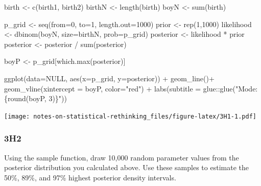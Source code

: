 \documentclass[
]{book}
\newenvironment{Shaded}{\begin{snugshade}}{\end{snugshade}}
\newcommand{\AttributeTok}[1]{\textcolor[rgb]{0.77,0.63,0.00}{#1}}
\newcommand{\ConstantTok}[1]{\textcolor[rgb]{0.00,0.00,0.00}{#1}}
\newcommand{\DecValTok}[1]{\textcolor[rgb]{0.00,0.00,0.81}{#1}}
\newcommand{\FunctionTok}[1]{\textcolor[rgb]{0.00,0.00,0.00}{#1}}
\newcommand{\NormalTok}[1]{#1}
\newcommand{\OtherTok}[1]{\textcolor[rgb]{0.56,0.35,0.01}{#1}}
\newcommand{\SpecialCharTok}[1]{\textcolor[rgb]{0.00,0.00,0.00}{#1}}
\newcommand{\StringTok}[1]{\textcolor[rgb]{0.31,0.60,0.02}{#1}}
\begin{document}
\begin{Shaded}
\begin{Highlighting}[]
\NormalTok{birth }\OtherTok{\textless{}{-}} \FunctionTok{c}\NormalTok{(birth1, birth2)}
\NormalTok{birthN }\OtherTok{\textless{}{-}} \FunctionTok{length}\NormalTok{(birth)}
\NormalTok{boyN }\OtherTok{\textless{}{-}} \FunctionTok{sum}\NormalTok{(birth)}

\NormalTok{p\_grid }\OtherTok{\textless{}{-}} \FunctionTok{seq}\NormalTok{(}\AttributeTok{from=}\DecValTok{0}\NormalTok{, }\AttributeTok{to=}\DecValTok{1}\NormalTok{, }\AttributeTok{length.out=}\DecValTok{1000}\NormalTok{)}
\NormalTok{prior }\OtherTok{\textless{}{-}} \FunctionTok{rep}\NormalTok{(}\DecValTok{1}\NormalTok{,}\DecValTok{1000}\NormalTok{)}
\NormalTok{likelihood }\OtherTok{\textless{}{-}} \FunctionTok{dbinom}\NormalTok{(boyN, }\AttributeTok{size=}\NormalTok{birthN, }\AttributeTok{prob=}\NormalTok{p\_grid)}
\NormalTok{posterior }\OtherTok{\textless{}{-}}\NormalTok{ likelihood }\SpecialCharTok{*}\NormalTok{ prior}
\NormalTok{posterior }\OtherTok{\textless{}{-}}\NormalTok{ posterior }\SpecialCharTok{/} \FunctionTok{sum}\NormalTok{(posterior)}

\NormalTok{boyP }\OtherTok{\textless{}{-}}\NormalTok{ p\_grid[}\FunctionTok{which.max}\NormalTok{(posterior)]}

\FunctionTok{ggplot}\NormalTok{(}\AttributeTok{data=}\ConstantTok{NULL}\NormalTok{, }\FunctionTok{aes}\NormalTok{(}\AttributeTok{x=}\NormalTok{p\_grid, }\AttributeTok{y=}\NormalTok{posterior)) }\SpecialCharTok{+} 
  \FunctionTok{geom\_line}\NormalTok{()}\SpecialCharTok{+}
  \FunctionTok{geom\_vline}\NormalTok{(}\AttributeTok{xintercept =}\NormalTok{ boyP, }\AttributeTok{color=}\StringTok{"red"}\NormalTok{) }\SpecialCharTok{+} 
  \FunctionTok{labs}\NormalTok{(}\AttributeTok{subtitle =}\NormalTok{ glue}\SpecialCharTok{::}\FunctionTok{glue}\NormalTok{(}\StringTok{"Mode: \{round(boyP, 3)\}"}\NormalTok{))}
\end{Highlighting}
\end{Shaded}

\texttt{[image: notes-on-statistical-rethinking\_files/figure-latex/3H1-1.pdf]}

\hypertarget{h2-1}{%
\subsubsection*{3H2}\label{h2-1}}

Using the sample function, draw 10,000 random parameter values from the posterior distribution you calculated above. Use these samples to estimate the 50\%, 89\%, and 97\% highest posterior density intervals.
\end{document}
